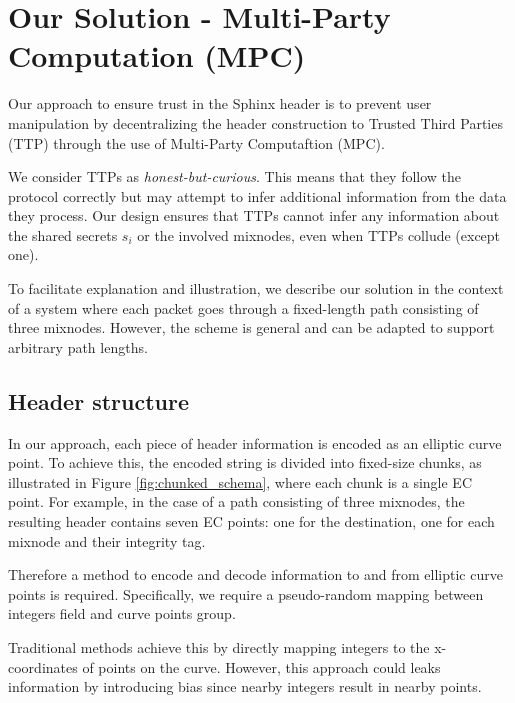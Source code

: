 \section{Our Solution - Multi-Party Computation (MPC)}\label{sec:scheme}

Our approach to ensure trust in the Sphinx header is to prevent user manipulation by decentralizing the header construction to Trusted Third Parties (TTP) through the use of Multi-Party Computaftion (MPC).
\newline

We consider TTPs as \textit{honest-but-curious}.
This means that they follow the protocol correctly but may attempt to infer additional information from the data they process.
Our design ensures that TTPs cannot infer any information about the shared secrets $ s_i $ or the involved mixnodes, even when TTPs collude (except one).
\newline

To facilitate explanation and illustration, we describe our solution in the context of a system where each packet goes through a fixed-length path consisting of three mixnodes.
However, the scheme is general and can be adapted to support arbitrary path lengths. 


\subsection{Header structure}

In our approach, each piece of header information is encoded as an elliptic curve point. 
To achieve this, the encoded string is divided into fixed-size chunks, as illustrated in Figure \ref{fig:chunked_schema}, where each chunk is a single EC point. 
For example, in the case of a path consisting of three mixnodes, the resulting header contains seven EC points: one for the destination, one for each mixnode and their integrity tag.

Therefore a method to encode and decode information to and from elliptic curve points is required. 
Specifically, we require a pseudo-random mapping between integers field and curve points group.

Traditional methods achieve this by directly mapping integers to the x-coordinates of points on the curve. 
However, this approach could leaks information by introducing bias since nearby integers result in nearby points.

